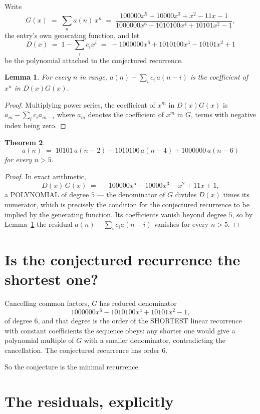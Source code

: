 \documentclass[11pt,a4paper]{article}
\theoremstyle{plain}
\newtheorem{theorem}{Theorem}
\newtheorem{lemma}[theorem]{Lemma}
\theoremstyle{definition}
\begin{document}
Write
\[
G(x)\;=\;\sum_{n}a(n)\,x^{n}\;=\;\frac{100000 x^{5} + 10000 x^{3} + x^{2} - 11 x - 1}{1000000 x^{6} - 1010100 x^{4} + 10101 x^{2} - 1},
\]
the entry's own generating function, and let
\[
D(x)\;=\;1-\sum_i c_i x^{i}\;=\;- 1000000 x^{6} + 1010100 x^{4} - 10101 x^{2} + 1
\]
be the polynomial attached to the conjectured recurrence.

\begin{lemma}\label{lem:key}
For every $n$ in range, $a(n)-\sum_i c_i\,a(n-i)$ is the coefficient of $x^{n}$ in
$D(x)G(x)$.
\end{lemma}

\begin{proof}
Multiplying power series, the coefficient of $x^{m}$ in $D(x)G(x)$ is
$a_m-\sum_i c_i a_{m-i}$ where $a_m$ denotes the coefficient of $x^{m}$ in $G$, terms with
negative index being zero.
\end{proof}

\begin{theorem}
\[
a(n)\;=\;10101\,a(n-2) - 1010100\,a(n-4) + 1000000\,a(n-6)
\]
for every $n>5$.
\end{theorem}

\begin{proof}
In exact arithmetic,
\[
D(x)\,G(x)\;=\;- 100000 x^{5} - 10000 x^{3} - x^{2} + 11 x + 1,
\]
a POLYNOMIAL of degree $5$ --- the denominator of $G$ divides $D(x)$ times its numerator,
which is precisely the condition for the conjectured recurrence to be implied by the
generating function. Its coefficients vanish beyond degree $5$, so by
Lemma~\ref{lem:key} the residual $a(n)-\sum_ic_ia(n-i)$ vanishes for every
$n>5$.
\end{proof}

\section{Is the conjectured recurrence the shortest one?}

Cancelling common factors, $G$ has reduced denominator
\[
1000000 x^{6} - 1010100 x^{4} + 10101 x^{2} - 1,
\]
of degree $6$, and that degree is the order of the SHORTEST linear recurrence with
constant coefficients the sequence obeys: any shorter one would give a polynomial multiple of
$G$ with a smaller denominator, contradicting the cancellation. The conjectured recurrence has
order $6$.

So the conjecture is the minimal recurrence.

\section{The residuals, explicitly}
\end{document}
